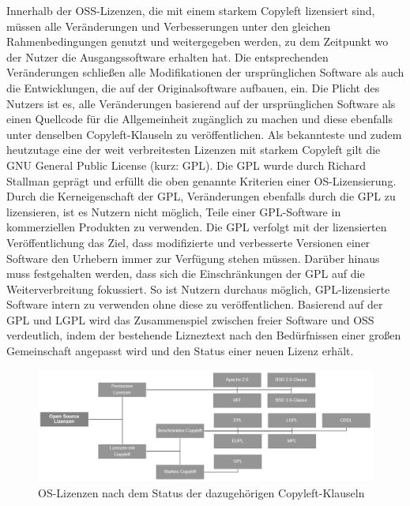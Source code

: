 Innerhalb der OSS-Lizenzen, die mit einem starkem Copyleft lizensiert sind, müssen alle Veränderungen und Verbesserungen unter den gleichen Rahmenbedingungen genutzt und weitergegeben werden, zu dem Zeitpunkt wo der Nutzer die Ausgangssoftware erhalten hat. Die entsprechenden Veränderungen schließen alle Modifikationen der ursprünglichen Software als auch die Entwicklungen, die auf der Originalsoftware aufbauen, ein. \cite[S. 20]{renner_open_2006} Die Plicht des Nutzers ist es, alle Veränderungen basierend auf der ursprünglichen Software als einen Quellcode für die Allgemeinheit zugänglich zu machen und diese ebenfalls unter denselben Copyleft-Klauseln zu veröffentlichen. Als bekannteste und zudem heutzutage eine der weit verbreitesten Lizenzen mit starkem Copyleft gilt die GNU General Public License (kurz: GPL). \cite{fsf_gnu_3021} Die GPL wurde durch Richard Stallman geprägt und erfüllt die oben genannte Kriterien einer OS-Lizensierung. Durch die Kerneigenschaft der GPL, Veränderungen ebenfalls durch die GPL zu lizensieren, ist es Nutzern nicht möglich, Teile einer GPL-Software in kommerziellen Produkten zu verwenden. \cite[S. 10/11]{bitkom_open_nodate} Die GPL verfolgt mit der lizensierten Veröffentlichung das Ziel, dass modifizierte und verbesserte Versionen einer Software den Urhebern immer zur Verfügung stehen müssen. Darüber hinaus muss festgehalten werden, dass sich die Einschränkungen der GPL auf die Weiterverbreitung fokussiert. So ist Nutzern durchaus möglich, GPL-lizensierte Software intern zu verwenden ohne diese zu veröffentlichen. Basierend auf der GPL und LGPL wird das Zusammenspiel zwischen freier Software und OSS verdeutlich, indem der bestehende Lizneztext nach den Bedürfnissen einer großen Gemeinschaft angepasst wird und den Status einer neuen Lizenz erhält. \cite[S. 35/36]{schaaf_open-source-lizenzen_2013}

\begin{figure}[h]
    \centering
    \includegraphics[scale=0.55]{Bilder/Lizenzenvarianten.png}
    \caption{OS-Lizenzen nach dem Status der dazugehörigen Copyleft-Klauseln}
\end{figure}

